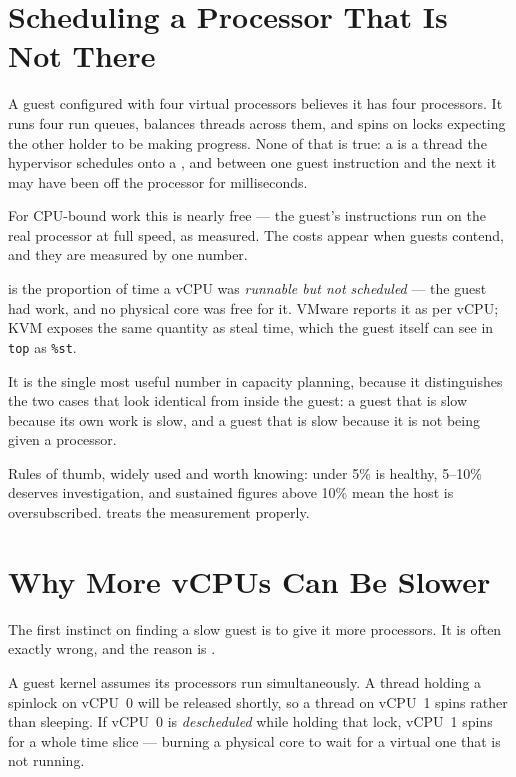 \section{Scheduling a Processor That Is Not There}

A guest configured with four virtual processors believes it has four
processors. It runs four run queues, balances threads across them, and spins
on locks expecting the other holder to be making progress. None of that is
true: a  is a thread the hypervisor schedules onto a ,
and between one guest instruction and the next it may have been off the
processor for milliseconds.

For CPU-bound work this is nearly free --- the guest's instructions run on the
real processor at full speed, as  measured. The costs
appear when guests contend, and they are measured by one number.

\begin{definitionbox}
 is the proportion of time a vCPU was \emph{runnable but not
scheduled} --- the guest had work, and no physical core was free for it.
VMware reports it as  per vCPU; KVM exposes the same quantity as
steal time, which the guest itself can see in \texttt{top} as \texttt{\%st}.

\smallskip
It is the single most useful number in capacity planning, because it
distinguishes the two cases that look identical from inside the guest: a guest
that is slow because its own work is slow, and a guest that is slow because it
is not being given a processor.

\smallskip
Rules of thumb, widely used and worth knowing: under 5\% is healthy, 5--10\%
deserves investigation, and sustained figures above 10\% mean the host is
oversubscribed.  treats the measurement properly.
\end{definitionbox}

\section{Why More vCPUs Can Be Slower}

The first instinct on finding a slow guest is to give it more processors. It
is often exactly wrong, and the reason is .

A guest kernel assumes its processors run simultaneously. A thread holding a
spinlock on vCPU~0 will be released shortly, so a thread on vCPU~1 spins rather
than sleeping. If vCPU~0 is \emph{descheduled} while holding that lock, vCPU~1
spins for a whole time slice --- burning a physical core to wait for a virtual
one that is not running.

